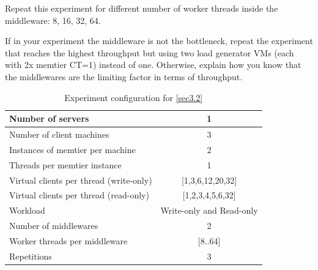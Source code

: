 \documentclass[11pt,a4paper]{article}
\begin{document}
Repeat this experiment for different number of worker threads inside the middleware: 8, 16, 32, 64.

If in your experiment the middleware is not the bottleneck, repeat the experiment that reaches the highest throughput but using two load generator VMs (each with 2x memtier CT=1) instead of one. Otherwise, explain how you know that the middlewares are the limiting factor in terms of throughput.

\begin{center}
    \begin{table}
		\begin{tabular}{|l|c|}
			\hline Number of servers                & 1                        \\ 
			\hline Number of client machines        & 3                        \\ 
			\hline Instances of memtier per machine & 2                        \\ 
			\hline Threads per memtier instance     & 1                        \\
			\hline Virtual clients per thread (write-only)  & [1,3,6,12,20,32] \\ 
			\hline Virtual clients per thread (read-only)   & [1,2,3,4,5,6,32] \\ 
			\hline Workload                         & Write-only and Read-only \\
			\hline Number of middlewares            & 2                        \\
			\hline Worker threads per middleware    & [8..64]                  \\
			\hline Repetitions                      & 3                        \\ 
			\hline 
		\end{tabular}
		\caption{Experiment configuration for \autoref{sec3.2}} \label{exp3-2}
	\end{table}
\end{center}
\end{document}
